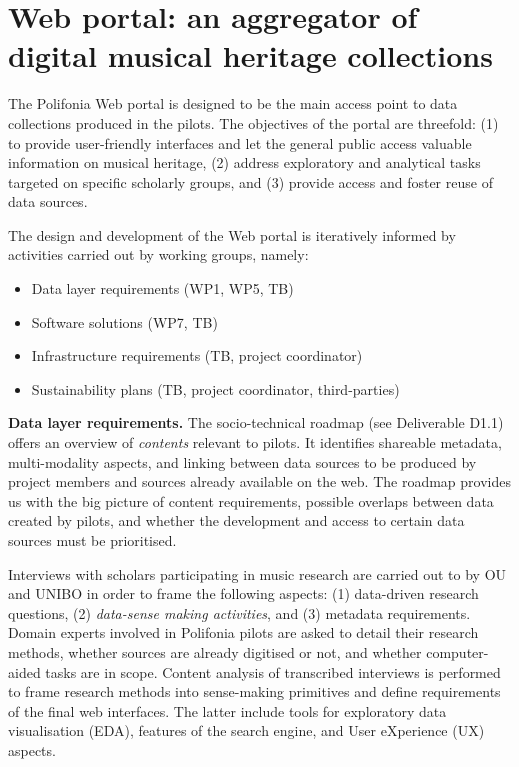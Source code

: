 \chapter{Web portal: an aggregator of digital musical heritage collections}\label{ch:portal}

The Polifonia Web portal is designed to be the main access point to data collections produced in the pilots. 
The objectives of the portal are threefold: (1) to provide user-friendly interfaces and let the general public access valuable information on musical heritage, (2) address exploratory and analytical tasks targeted on specific scholarly groups, and (3) provide access and foster reuse of data sources.

The design and development of the Web portal is iteratively informed by activities carried out by working groups, namely:

\begin{itemize}
    \item Data layer requirements (WP1, WP5, TB)
    \item Software solutions (WP7, TB)
    \item Infrastructure requirements (TB, project coordinator)
    \item Sustainability plans (TB, project coordinator, third-parties)
\end{itemize}
 
\textbf{Data layer requirements.} The socio-technical roadmap (see Deliverable D1.1) offers an overview of \emph{contents} relevant to pilots. It identifies shareable metadata, multi-modality aspects, and linking between data sources to be produced by project members and sources already available on the web. The roadmap provides us with the big picture of content requirements, possible overlaps between data created by pilots, and whether the development and access to certain data sources must be prioritised.

Interviews with scholars participating in music research are carried out to by OU and UNIBO in order to frame the following aspects: (1) data-driven research questions, (2) \emph{data-sense making activities}, and (3) metadata requirements. Domain experts involved in Polifonia pilots are asked to detail their research methods, whether sources are already digitised or not, and whether computer-aided tasks are in scope. Content analysis of transcribed interviews is performed to frame research methods into sense-making primitives and define requirements of the final web interfaces. The latter include tools for exploratory data visualisation (EDA), features of the search engine, and User eXperience (UX) aspects. 

